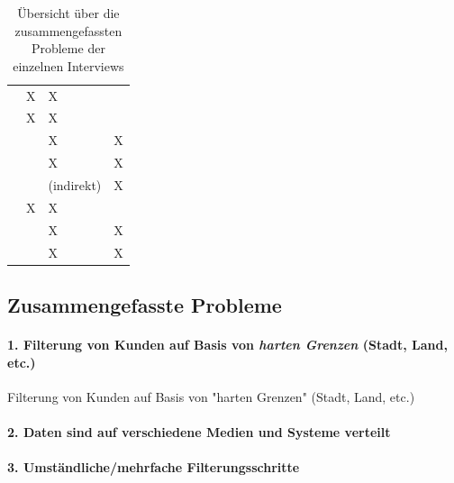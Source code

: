 \documentclass[../Bachelorarbeit.tex]{subfiles}
\begin{document}
\def\arraystretch{1.5} %
\begin{table}[h]
	\begin{tabular}{|p{5cm}|p{}|p{}|p{}|}
		\hline  
			& \ctab \nameref{anhang:interview1} 
			& \ctab \nameref{anhang:interview2} 
			& \ctab \nameref{anhang:interview3} \\ 
		\hline 
			\nameref{p1}
			& \ctab  X
			& \ctab X
			& \ctab  \\ 
		\hline 
			\nameref{p2}
			& \ctab X
			& \ctab X
			& \ctab  \\ 
		\hline 
			\nameref{p3}
			& \ctab  
			& \ctab X
			& \ctab X \\ 
		\hline 
			\nameref{p4}
			& \ctab 
			& \ctab  X
			& \ctab X \\ 
		\hline 
			\nameref{p5}
			& \ctab 
			& \ctab (indirekt)
			& \ctab X \\ 
		\hline 
			\nameref{p6}
			& \ctab X
			& \ctab X
			& \ctab  \\ 
		\hline 
			\nameref{p7}
			& \ctab 
			& \ctab X
			& \ctab X \\
		\hline 
			\nameref{p8}
			& \ctab
			& \ctab X
			& \ctab X \\
		\hline 
	\end{tabular} 
	\caption[Zusammenfassung der Probleme]{Übersicht über die zusammengefassten Probleme der einzelnen Interviews}
	\label{tab:problemeInterviews}
\end{table}

\subsection*{Zusammengefasste Probleme}
\paragraph*{1. Filterung von Kunden auf Basis von \textit{harten Grenzen} (Stadt, Land, etc.)}
\label{p1}
Filterung von Kunden auf Basis von "harten Grenzen" (Stadt, Land, etc.)  

\paragraph*{2. Daten sind auf verschiedene Medien und Systeme verteilt}
\label{p2}

\paragraph*{3. Umständliche/mehrfache Filterungsschritte}
\label{p3}
\end{document}
